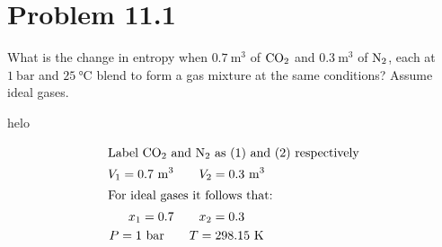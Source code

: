 \documentclass{article}
\begin{document}
\section*{Problem 11.1}
What is the change in entropy when $0.7~\unit{\meter\cubed}$ of
$\ce{CO2}$ and $0.3~\unit{\meter\cubed}$ of $\ce{N2}$, each at
$1~\unit{\bar}$ and $25~\unit{\degreeCelsius}$ blend to form a gas
mixture at the same conditions? Assume ideal gases.

\begin{solution}

  helo

  \begin{gather*}

    \intertext{Label $\ce{CO2}$ and $\ce{N2}$ as (1) and (2) respectively}

    V_1 = 0.7~\unit{\meter\cubed} \qquad V_2 = 0.3~\unit{\meter\cubed} \\

    \intertext{For ideal gases it follows that:}

    x_1 = 0.7 \qquad x_2 = 0.3 \\

    P = 1~\unit{\bar} \qquad T = 298.15~\unit{\kelvin}

  \end{gather*}

\end{solution}
\end{document}
